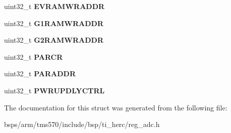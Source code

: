 \begin{DoxyCompactItemize}
uint32\+\_\+t {\bfseries E\+V\+R\+A\+M\+W\+R\+A\+D\+DR}
\item 
\mbox{\label{structtms570__adc__t_a1f6ecdf3cfac213b254a0024342958bd}} 
uint32\+\_\+t {\bfseries G1\+R\+A\+M\+W\+R\+A\+D\+DR}
\item 
\mbox{\label{structtms570__adc__t_a8e8b1e00299c168045b740742cead0be}} 
uint32\+\_\+t {\bfseries G2\+R\+A\+M\+W\+R\+A\+D\+DR}
\item 
\mbox{\label{structtms570__adc__t_a8bc6db67461f6c59191b16b6acd42d03}} 
uint32\+\_\+t {\bfseries P\+A\+R\+CR}
\item 
\mbox{\label{structtms570__adc__t_a61c4e0d534a9477a7937bebfa047ad7a}} 
uint32\+\_\+t {\bfseries P\+A\+R\+A\+D\+DR}
\item 
\mbox{\label{structtms570__adc__t_a5a2e18f7e26e63dbe250908fd9fdc6eb}} 
uint32\+\_\+t {\bfseries P\+W\+R\+U\+P\+D\+L\+Y\+C\+T\+RL}
\end{DoxyCompactItemize}


The documentation for this struct was generated from the following file\+:\begin{DoxyCompactItemize}
\item 
bsps/arm/tms570/include/bsp/ti\+\_\+herc/reg\+\_\+adc.\+h\end{DoxyCompactItemize}
